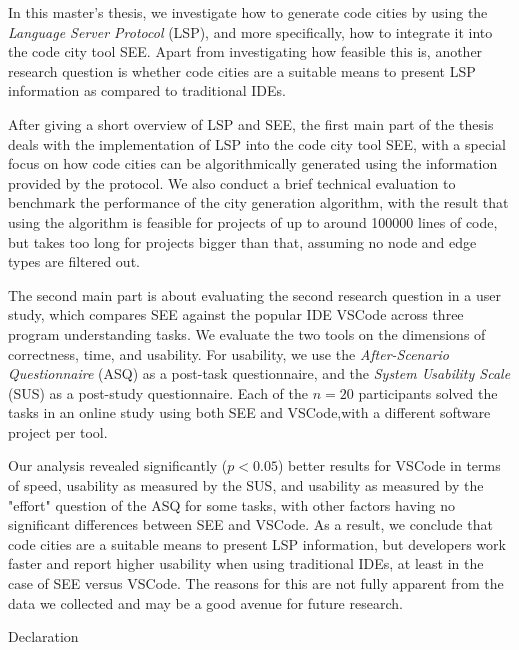 \documentclass[%
	paper=A4,
	twoside=true,
	openright,
	parskip=half,           %
  11pt,
	chapterprefix=true,     %
	headings=normal,        %
	bibliography=totocnumbered,     %
	titlepage=on,           %
	captions=tableabove,    %
]{scrbook}
\newcommand{\participants}{20\xspace}
\begin{document}
In this master's thesis, we investigate how to generate code cities by using the \emph{Language Server Protocol} (LSP), and more specifically, how to integrate it into the code city tool SEE.
Apart from investigating how feasible this is, another research question is whether code cities are a suitable means to present LSP information as compared to traditional IDEs.

After giving a short overview of LSP and SEE, the first main part of the thesis deals with the implementation of LSP into the code city tool SEE, with a special focus on how code cities can be algorithmically generated using the information provided by the protocol.
We also conduct a brief technical evaluation to benchmark the performance of the city generation algorithm, with the result that using the algorithm is feasible for projects of up to around \num{100000} lines of code, but takes too long for projects bigger than that, assuming no node and edge types are filtered out.

The second main part is about evaluating the second research question in a user study, which compares SEE against the popular IDE VSCode across three program understanding tasks.
We evaluate the two tools on the dimensions of correctness, time, and usability.
For usability, we use the \emph{After-Scenario Questionnaire} (ASQ) as a post-task questionnaire, and the \emph{System Usability Scale} (SUS) as a post-study questionnaire.
Each of the $n = \participants$ participants solved the tasks in an online study using both SEE and VSCode,with a different software project per tool.

Our analysis revealed significantly ($p < 0.05$) better results for VSCode in terms of speed, usability as measured by the SUS, and usability as measured by the "effort" question of the ASQ for some tasks, with other factors having no significant differences between SEE and VSCode.
As a result, we conclude that code cities are a suitable means to present LSP information, but developers work faster and report higher usability when using traditional IDEs, at least in the case of SEE versus VSCode.
The reasons for this are not fully apparent from the data we collected and may be a good avenue for future research.

\cleardoublepage{}

{Declaration}

\end{document}
